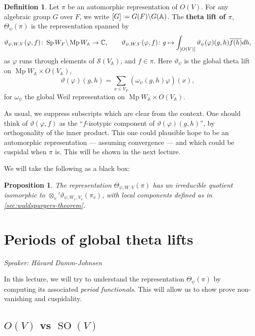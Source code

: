 \documentclass[11pt,a4paper,leqno]{article}
\let\mc\mathcal
\newcommand{\A}{\mathbb{A}}
\newcommand{\1}{\mathbbm{1}}
\newcommand{\C}{\mathbb{C}}
\newcommand*{\defeq}{\mathrel{\vcenter{\baselineskip0.5ex \lineskiplimit0pt
      \hbox{\scriptsize.}\hbox{\scriptsize.}}}%
  =}
\renewcommand{\phi}{\varphi}
\renewcommand{\theta}{\vartheta}
\DeclareMathOperator{\Sp}{Sp}
\DeclareMathOperator{\Mp}{Mp}
\DeclareMathOperator{\SO}{SO}
\theoremstyle{plain}
\newtheorem{prop}[theorem]{Proposition}
\theoremstyle{definition}
\newtheorem{definition}[theorem]{Definition}
\theoremstyle{remark}
\numberwithin{equation}{section}
\begin{document}
\begin{definition}
  Let $\pi$ be an automorphic representation of $O(V)$. For any
  algebraic group $G$ over $F$, we write
  $[G] \defeq G(F)\backslash G(\A)$. The \textbf{theta lift of $\pi$}, $\Theta_{\psi}(\pi)$ is the
  representation spanned by
  \begin{equation}
    \label{eq:30}
\theta_{\psi,W,V}(\phi,f) \colon \Sp W_{F} \backslash \Mp W_{\A} \to \C, \qq{} \theta_{\psi,W,V}(\phi,f)  \colon g \mapsto \int_{[O(V)]} \theta_{\psi}(\phi)(g,h)\overline{f(h)}dh,
  \end{equation}
  as $\phi$ runs through elements of $\mc S(V_{\A})$, and
  $f \in \pi$. Here $\theta_{\psi}$ is the global theta lift
  on $\Mp W_{\A}\times O(V_{\A})$,
\begin{equation}
  \label{eq:32}
\theta(\phi)(g,h) = \sum_{x \in V_{F}} (\omega_{\psi}(g,h)\phi)(x),
\end{equation}
for $\omega_{\psi}$ the global Weil representation on $\Mp W_{\A} \times O(V_{\A})$.
\end{definition}
As usual, we suppress subscripts which are clear from the context.
One should think of $\theta(\phi,f)$ as the ``$f$-isotypic component of
$\theta(\phi)(g,h)$'', by orthogonality of the inner product. This one could
plausible hope to be an automorphic representation --- assuming
convergence --- and which could be cuspidal when $\pi$ is. This will be
shown in the next lecture.

We will take the following as a black box:
\begin{prop}
  The representation $\Theta_{\psi,W,V}(\pi)$ has an irreducible quotient
  isomorphic to $\otimes_{v}' \theta_{\psi,W_{v},V_{v}}(\pi_{v})$, with local components
  defined as in \cref{sec:waldspurgers-theorem}.
\end{prop}

\section{Periods of global theta lifts}
\label{sec:periods-global}
\emph{Speaker: Håvard Damm-Johnsen}

In this lecture, we will try to understand the representation
$\Theta_{\psi}(\pi)$ by computing its associated \emph{period functionals}. This
will allow us to show prove non-vanishing and cuspidality.

\subsection[O(V) vs SO(V)]{$O(V)$ vs $\SO(V)$}
\label{sec:OV-vs-SOV}
\end{document}
